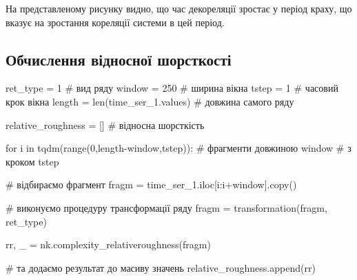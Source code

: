 \documentclass[
  letterpaper,
]{report}
\newenvironment{Shaded}{\begin{snugshade}}{\end{snugshade}}
\newcommand{\BuiltInTok}[1]{\textcolor[rgb]{0.00,0.23,0.31}{#1}}
\newcommand{\CommentTok}[1]{\textcolor[rgb]{0.37,0.37,0.37}{#1}}
\newcommand{\ControlFlowTok}[1]{\textcolor[rgb]{0.00,0.23,0.31}{#1}}
\newcommand{\DecValTok}[1]{\textcolor[rgb]{0.68,0.00,0.00}{#1}}
\newcommand{\KeywordTok}[1]{\textcolor[rgb]{0.00,0.23,0.31}{#1}}
\newcommand{\NormalTok}[1]{\textcolor[rgb]{0.00,0.23,0.31}{#1}}
\newcommand{\OperatorTok}[1]{\textcolor[rgb]{0.37,0.37,0.37}{#1}}
\begin{document}
На представленому рисунку видно, що час декореляції зростає у період
краху, що вказує на зростання кореляції системи в цей період.

\hypertarget{ux43eux431ux447ux438ux441ux43bux435ux43dux43dux44f-ux432ux456ux434ux43dux43eux441ux43dux43eux457-ux448ux43eux440ux441ux442ux43aux43eux441ux442ux456}{%
\subsection{Обчислення відносної
шорсткості}\label{ux43eux431ux447ux438ux441ux43bux435ux43dux43dux44f-ux432ux456ux434ux43dux43eux441ux43dux43eux457-ux448ux43eux440ux441ux442ux43aux43eux441ux442ux456}}

\begin{Shaded}
\begin{Highlighting}[]
\NormalTok{ret\_type }\OperatorTok{=} \DecValTok{1}                      \CommentTok{\# вид ряду}
\NormalTok{window }\OperatorTok{=} \DecValTok{250}                      \CommentTok{\# ширина вікна}
\NormalTok{tstep }\OperatorTok{=} \DecValTok{1}                         \CommentTok{\# часовий крок вікна }
\NormalTok{length }\OperatorTok{=} \BuiltInTok{len}\NormalTok{(time\_ser\_1.values)   }\CommentTok{\# довжина самого ряду }

\NormalTok{relative\_roughness }\OperatorTok{=}\NormalTok{ []           }\CommentTok{\# відносна шорсткість}
\end{Highlighting}
\end{Shaded}

\begin{Shaded}
\begin{Highlighting}[]
\ControlFlowTok{for}\NormalTok{ i }\KeywordTok{in}\NormalTok{ tqdm(}\BuiltInTok{range}\NormalTok{(}\DecValTok{0}\NormalTok{,length}\OperatorTok{{-}}\NormalTok{window,tstep)): }\CommentTok{\# фрагменти довжиною window  }
                                             \CommentTok{\# з кроком tstep}

    \CommentTok{\# відбираємо фрагмент}
\NormalTok{    fragm }\OperatorTok{=}\NormalTok{ time\_ser\_1.iloc[i:i}\OperatorTok{+}\NormalTok{window].copy()   }

    \CommentTok{\# виконуємо процедуру трансформації ряду }
\NormalTok{    fragm }\OperatorTok{=}\NormalTok{ transformation(fragm, ret\_type)}

\NormalTok{    rr, \_ }\OperatorTok{=}\NormalTok{ nk.complexity\_relativeroughness(fragm) }

    \CommentTok{\# та додаємо результат до масиву значень}
\NormalTok{    relative\_roughness.append(rr)}
\end{Highlighting}
\end{Shaded}
\end{document}
